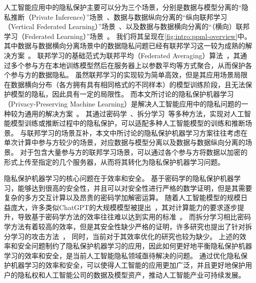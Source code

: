 人工智能应用中的隐私保护主要可以分为三个场景，分别是数据与模型分离的“隐私推断（Private Inference）”场景~\cite{mann_2023_secure_inference}、数据与数据纵向分离的“纵向联邦学习（Vertical Federated Learning）”场景~\cite{liu2024vertical}、以及数据与数据横向分离的“（横向）联邦学习（Federated Learning）”场景~\cite{yangqiang2019federated}。
%
我们将其呈现在\autoref{fig:intro:ppml-overview}中。
%
其中数据与数据横向分离场景中的数据隐私问题已经有联邦学习这一较为成熟的解决方案~\cite{yangqiang2019federated}。
联邦学习的基础范式为联邦平均（Federated Averaging）算法~\cite{mcmahan_2017_fedavg}，其通过多个参与方在本地训练模型然后在服务器上以参数平均等方式聚合，从而保护各个参与方的数据隐私。
%
虽然联邦学习的实现较为简单高效，但是其应用场景局限在数据横向分布（各方拥有具有相同格式的不同样本）的模型训练阶段，且无法保护模型的隐私，因此具有一定的局限性。
%
而本文所讨论的隐私保护机器学习（Privacy-Preserving Machine Learning）是解决人工智能应用中的隐私问题的一种较为通用的解决方案~\cite{al_2019_ppml,xu_2021_ppml}。
%
其通过密码学~\cite{evans_2018_pragmatic_mpc}、拆分学习~\cite{vepakomma2018split}等多种方法，实现对人工智能模型训练或推断过程中的隐私保护，可以适配多种人工智能模型的训练和推断场景。
%
与联邦学习的场景互补，本文中所讨论的隐私保护机器学习方案往往考虑在单次计算中参与方较少的场景，对应数据与模型分离以及数据与数据纵向分离的场景。
%
对于包含大量参与方的联邦学习场景，可以通过各个参与方将数据以加密的形式上传至指定的几个服务器，从而将其转化为隐私保护机器学习问题。

隐私保护机器学习的核心问题在于效率和安全。
%
基于密码学的隐私保护机器学习，能够达到很高的安全性，并且可以对安全性进行严格的数学证明，但是其需要复杂的多方交互计算以及昂贵的密码学加解密运算。
随着人工智能模型的规模日益庞大，许多类似ChatGPT的大规模模型被提出~\cite{chatgpt,touvron_2023_llama,duzhengxiao_2022_glm}，其对计算能力的要求逐步提升，导致基于密码学方法的效率往往难以达到实用的标准~\cite{hou2023ciphergpt}。
%
而拆分学习相比密码学方法有着较高的效率，但是其安全性缺少严格的证明，许多研究也提出了针对拆分学习的攻击方法~\cite{hezecheng_2019_model_inversion_attack,abuadbba2020can_split}，
同时，当前对于其效率优化的研究也较为缺少。
%
上述的效率和安全问题制约了隐私保护机器学习的应用，因此如何更好地平衡隐私保护机器学习的效率和安全，是当前人工智能隐私领域亟待解决的问题。
%
通过优化隐私保护机器学习的效率和安全，可以使得人工智能的应用更加广泛，并且更好地保护用户的隐私权和人工智能公司的数据及模型资产，推动人工智能产业可持续发展。


